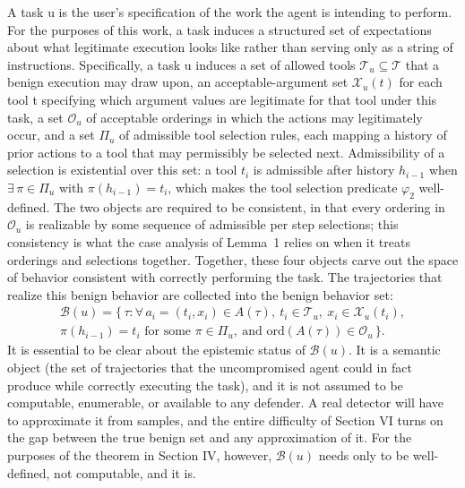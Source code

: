 \documentclass[journal]{IEEEtran}
\theoremstyle{remark}
\begin{document}
A task u is the user's specification of the work the agent is intending to perform. For the purposes of this work, a task induces a structured set of expectations about what legitimate execution looks like rather than serving only as a string of instructions. Specifically, a task u induces a set of allowed tools $\mathcal{T}_u\subseteq\mathcal{T}$ that a benign execution may draw upon, an acceptable-argument set $\mathcal{X}_u(t)$ for each tool t specifying which argument values are legitimate for that tool under this task, a set $\mathcal{O}_u$ of acceptable orderings in which the actions may legitimately occur, and a set $\Pi_u$ of admissible tool selection rules, each mapping a history of prior actions to a tool that may permissibly be selected next. Admissibility of a selection is existential over this set: a tool $t_i$ is admissible after history $h_{i-1}$ when $\exists\,\pi\in\Pi_u$ with $\pi(h_{i-1})=t_i$, which makes the tool selection predicate $\varphi_2$ well-defined. The two objects are required to be consistent, in that every ordering in $\mathcal{O}_u$ is realizable by some sequence of admissible per step selections; this consistency is what the case analysis of Lemma~1 relies on when it treats orderings and selections together. Together, these four objects carve out the space of behavior consistent with correctly performing the task. The trajectories that realize this benign behavior are collected into the benign behavior set:
\begin{multline*}
\mathcal{B}(u) = \bigl\{\, \tau : \forall\, a_i=(t_i,x_i)\in A(\tau),\ t_i\in\mathcal{T}_u,\ x_i\in\mathcal{X}_u(t_i), \\
\pi(h_{i-1})=t_i \text{ for some } \pi\in\Pi_u,\ \text{and } \mathrm{ord}(A(\tau))\in\mathcal{O}_u \,\bigr\}.
\end{multline*}
It is essential to be clear about the epistemic status of $\mathcal{B}(u)$. It is a semantic object (the set of trajectories that the uncompromised agent could in fact produce while correctly executing the task), and it is not assumed to be computable, enumerable, or available to any defender. A real detector will have to approximate it from samples, and the entire difficulty of Section VI turns on the gap between the true benign set and any approximation of it. For the purposes of the theorem in Section IV, however, $\mathcal{B}(u)$ needs only to be well-defined, not computable, and it is.
\end{document}
